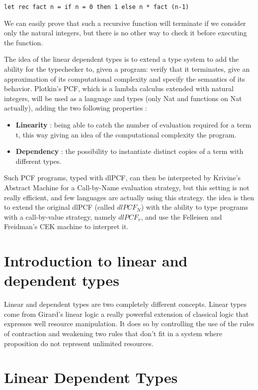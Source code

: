 \documentclass[a4paper,12pt]{report}
\begin{document}
\begin{verbatim}
let rec fact n = if n = 0 then 1 else n * fact (n-1)
\end{verbatim}

We can easily prove that such a recursive function will terminate if we consider
only the natural integers, but there is no other way to check it before
executing the function.

The idea of the linear dependent types is to extend a type system to
add the ability for the typechecker to, given a program: verify that
it terminates, give an approximation of its computational complexity and
specify the semantics of its behavior. Plotkin's PCF, which is a
lambda calculus extended with natural integers, will be used as a
language and types (only Nat and functions on Nat actually), adding
the two following properties :

\begin{itemize}
\item \textbf{Linearity} : being able to catch the number of evaluation required
  for a term t, this way giving an idea of the computational complexity the
  program.
\item \textbf{Dependency} : the possibility to instantiate distinct copies of a term with
  different types.
\end{itemize}

Such PCF programs, typed with dlPCF, can then be interpreted by Krivine's
Abstract Machine for a Call-by-Name evaluation strategy, but this setting is not
really efficient, and few languages are actually using this strategy. the idea
is then to extend the original dlPCF (called $ dlPCF_{N} $) with the ability to type
programs with a call-by-value strategy, namely $ dlPCF_{v} $, and use the Felleisen and
Freidman's CEK machine to interpret it.

\section{Introduction to linear and dependent types}

Linear and dependent types are two completely different
concepts. Linear types come from Girard's linear logic
\cite{girard1987linear} a really powerful extension of classical logic
that expresses well resource manipulation. It does so by controlling
the use of the rules of contraction and weakening two rules that don't
fit in a system where proposition do not represent unlimited
resources.

\section{Linear Dependent Types}
\end{document}
